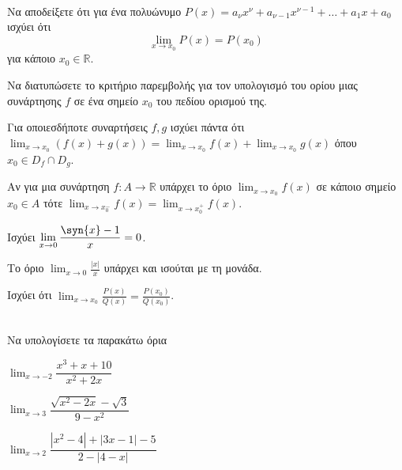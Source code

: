 \documentclass[twoside,nofonts,ektypwsh]{frontisthrio-diag}
\begin{document}
\begin{thema}
\item\mbox{}\\
\vspace{-5mm}
\begin{erwthma}
\item Να αποδείξετε ότι για ένα πολυώνυμο $ P(x)=a_\nu x^\nu+a_{\nu-1}x^{\nu-1}+\ldots+a_1 x+a_0 $ ισχύει ότι
\[ \lim_{x\to x_0}{P(x)}=P(x_0) \]
για κάποιο $ x_0\in\mathbb{R} $.
\item Να διατυπώσετε το κριτήριο παρεμβολής για τον υπολογισμό του ορίου μιας συνάρτησης $ f $ σε ένα σημείο $ x_0 $ του πεδίου ορισμού της.
\item \swstolathospan
\begin{alist}
\item Για οποιεσδήποτε συναρτήσεις $ f,g $ ισχύει πάντα ότι $ {\displaystyle\lim_{x\to x_0}{(f(x)+g(x))}=\lim_{x\to x_0}{f(x)}+\lim_{x\to x_0}{g(x)}} $ όπου $ x_0\in D_f\cap D_g $.
\item Αν για μια συνάρτηση $ f:A\to\mathbb{R} $ υπάρχει το όριο $ {\displaystyle\lim_{x\to x_0}{f(x)}} $ σε κάποιο σημείο $ x_0\in A $ τότε $ {\displaystyle\lim_{x\to x_0^-}{f(x)}=\displaystyle\lim_{x\to x_0^+}{f(x)}} $.
\item Ισχύει $ {\displaystyle\lim_{x\to0}{\frac{\syn{x}-1}{x}}=0} $.
\item Το όριο $ {\displaystyle\lim_{x\to 0}{\frac{|x|}{x}}} $ υπάρχει και ισούται με τη μονάδα.
\item Ισχύει ότι $ {\displaystyle\lim_{x\to x_0}{\frac{P(x)}{Q(x)}}=\frac{P(x_0)}{Q(x_0)}} $.
\end{alist}
\end{erwthma}
\item \mbox{}\\
Να υπολογίσετε τα παρακάτω όρια
\begin{multicols}{3}
\begin{erwthma}
\item $ {\displaystyle\lim_{x\to -2}\dfrac{x^3+x+10}{x^2+2x}} $
\item $ {\displaystyle\lim_{x\to 3}\dfrac{\sqrt{x^2-2x}-\sqrt{3}}{9-x^2}} $
\item $ {\displaystyle\lim_{x\to 2}\dfrac{|x^2-4|+|3x-1|-5}{2-|4-x|}} $
\end{erwthma}
\end{multicols}
\item\mbox{}\\

\end{thema}
\end{document}
